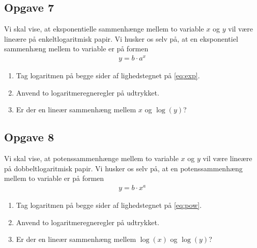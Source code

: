 \documentclass[12pt]{article}
\begin{document}
\subsection*{Opgave 7}
Vi skal vise, at eksponentielle sammenhænge mellem to variable $x$ og $y$ vil være lineære på enkeltlogaritmisk papir. Vi husker os selv på, at en eksponentiel sammenhæng mellem to variable er på formen
\begin{align}
	\label{eq:exp}
	y = b\cdot a^x
\end{align}
\begin{enumerate}[label=\roman*)]
	\item Tag logaritmen på begge sider af lighedstegnet på \eqref{eq:exp}.
	\item Anvend to logaritmeregneregler på udtrykket.
	\item Er der en lineær sammenhæng mellem $x$ og $\log(y)$?
\end{enumerate}

\subsection*{Opgave 8}
Vi skal vise, at potenssammenhænge mellem to variable $x$ og $y$ vil være lineære på dobbeltlogaritmisk papir. Vi husker os selv på, at en potenssammenhæng mellem to variable er på formen
\begin{align}
	\label{eq:pow}
	y = b\cdot x^a
\end{align}
\begin{enumerate}[label=\roman*)]
	\item Tag logaritmen på begge sider af lighedstegnet på \eqref{eq:pow}.
	\item Anvend to logaritmeregneregler på udtrykket.
	\item Er der en lineær sammenhæng mellem $\log(x)$ og $\log(y)$?
\end{enumerate}
\end{document}
